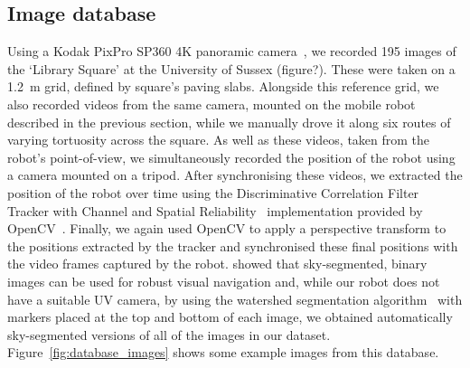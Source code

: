 \documentclass[letterpaper]{article}
\begin{document}
\subsection{Image database}
\label{sec:image_database}
Using a Kodak PixPro SP360 4K panoramic camera~\citep{JKImagingLtd}, we recorded 195 images of the ‘Library Square’ at the University of Sussex (figure?). 
These were taken on a \SI{1.2}{\metre} grid, defined by square’s paving slabs. 
Alongside this reference grid, we also recorded videos from the same camera, mounted on the mobile robot described in the previous section, while we manually drove it along six routes of varying tortuosity across the square. 
As well as these videos, taken from the robot’s point-of-view, we simultaneously recorded the position of the robot using a camera mounted on a tripod. 
After synchronising these videos, we extracted the position of the robot over time using the Discriminative Correlation Filter Tracker with Channel and Spatial Reliability~\citep{Lukezic2018} implementation provided by OpenCV~\citep{OpenCV}.
Finally, we again used OpenCV to apply a perspective transform to the positions extracted by the tracker and synchronised these final positions with the video frames captured by the robot. 
\citet{Stone2014} showed that sky-segmented, binary images can be used for robust visual navigation and, while our robot does not have a suitable UV camera, by using the watershed segmentation algorithm~\citep{Beucher1979} with markers placed at the top and bottom of each image, we obtained automatically sky-segmented versions of all of the images in our dataset.
Figure~\ref{fig:database_images} shows some example images from this database.
\end{document}
